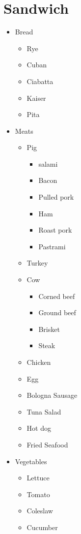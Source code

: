 \documentclass[10pt]{extarticle}
\begin{document}
		\section{Sandwich}
		\begin{itemize}
				\item Bread
				\begin{itemize}
					\item Rye
					\item Cuban
					\item Ciabatta
					\item Kaiser
					\item Pita
				\end{itemize}
				\item Meats				
				\begin{itemize}
						\item Pig
						\begin{itemize}
							\item salami
							\item Bacon
							\item Pulled pork
							\item Ham
							\item Roast pork
							\item Pastrami							
						\end{itemize}
						\item Turkey
						\item Cow
						\begin{itemize}
							\item Corned beef 
							\item Ground beef
							\item Brisket
							\item Steak
						\end{itemize}
						\item Chicken
						\item Egg
						\item Bologna Sausage
						\item Tuna Salad
						\item Hot dog 
						\item Fried Seafood
				\end{itemize}
				\item Vegetables			
				\begin{itemize}
						\item Lettuce
						\item Tomato
						\item Coleslaw
						\item Cucumber

\end{itemize}
\end{itemize}
\end{document}
